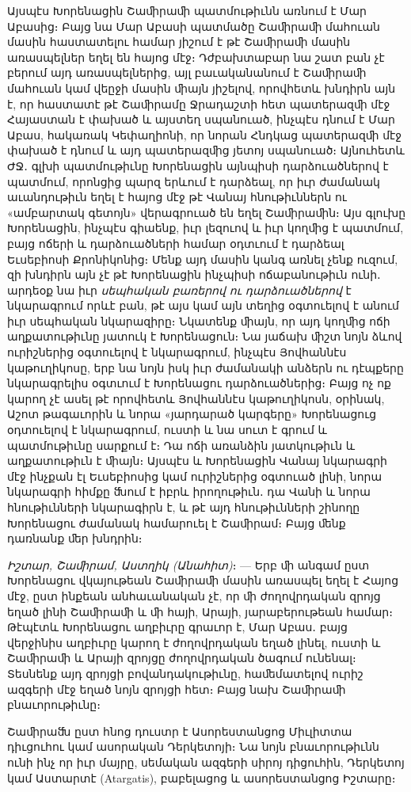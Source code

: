 \documentclass{article}
\begin{document}
{Այսպէս Խորենացին Շաﬕրաﬕ պատմութիւնն առնում է Մար Աբասից։ Բայց նա Մար Աբասի պատմածը Շաﬕրաﬕ մահուան մասին հաստատելու համար յիշում է թէ Շաﬕրաﬕ մասին առասպելներ եղել են հայոց մէջ։ Դժբախտաբար նա շատ բան չէ բերում այդ առասպելներից, այլ բաւականանում է Շաﬕրաﬕ մահուան կամ վեըջի մասին ﬕայն յիշելով, որովհետև խնդիրն այն է, որ հաստատէ թէ Շաﬕրամը Ջրադաշտի հետ պատերազﬕ մէջ Հայաստան է փախած և այստեղ սպանուած, ինչպէս դնում է Մար Աբաս, հակառակ Կեփաղիոնի, որ նորան Հնդկաց պատերազﬕ մէջ փախած է դնում և այդ պատերազﬕց յետոյ սպանուած։ Այնուհետև ԺՋ․ գլխի պատմութիւնը Խորենացին այնպիսի դարձուածներով է պատմում, որոնցից պարզ երևում է դարձեալ, որ իւր ժամանակ աւանդութիւն եղել է հայոց մէջ թէ Վանայ հնութիւններն ու «ամբարտակ գետոյն» վերագրուած են եղել Շաﬕրաﬕն։ Այս գլուխը Խորենացին, ինչպէս գիաենք, իւր լեզուով և իւր կողﬕց է պատմում, բայց ոճերի և դարձուածների համար օդտւում է դարձեալ Եւսեբիոսի Քրոնիկոնից։ Մենք այդ մասին կանգ առնել չենք ուզում, զի խնդիրն այն չէ թէ Խորենացին ինչպիսի ոճաբանութիւն ունի․ արդեօք նա իւր \emph{սեպհական բառերով ու դարձուածներով} է նկարագրում որևէ բան, թէ այս կամ այն տեղից օգտուելով է անում իւր սեպհական նկարազիրը։ Նկատենք ﬕայն, որ այդ կողﬕց ոճի աղքատութիւնը յատուկ է Խորենացուն։ Նա յաճախ ﬕշտ նոյն ձևով ուրիշներից օգտուելով է նկարագրում, ինչպէս Յովհաննէս կաթուղիկոսը, երբ նա նոյն իսկ իւր ժամանակի անձերն ու դէպքերը նկարագրելիս օգտւում է Խորենացու դարձուածներից։ Բայց ոչ ոք կարող չէ ասել թէ որովհետև Յովհաննէս կաթուղիկոսն, օրինակ, Աշոտ թագաւորին և նորա «յարդարած կարգերը» Խորենացուց օդտուելով է նկարագրում, ուստի և նա սուտ է գրում և պատմութիւնը սարքում է։ Դա ոճի առանձին յատկութիւն և աղքատութիւն է ﬕայն։ Այսպէս և Խորենացին Վանայ նկարագրի մէջ ինչքան էլ Եւսեբիոսից կամ ուրիշներից օգտուած լինի, նորա նկարագրի հիմքը ﬓում է իբրև իրողութիւն․ դա Վանի և նորա հնութիւնների նկարագիրն է, և թէ այդ հնութիւնների շինողը Խորենացու ժամանակ համարուել է Շաﬕրամ։ Բայց ﬔնք դառնանք ﬔր խնդրին։

\emph{Իշտար, Շաﬕրամ, Աստղիկ (Անահիտ)}։ — Երբ ﬕ անգամ ըստ Խորենացու վկայութեան Շաﬕրաﬕ մասին առասպել եղել է Հայոց մէջ, ըստ ինքեան անհաւանական չէ, որ ﬕ ժողովրդական զրոյց եղած լինի Շաﬕրաﬕ և ﬕ հայի, Արայի, յարաբերութեան համար։ Թէպէտև Խորենացու աղբիւրը գրաւոր է, Մար Աբաս․ բայց վերջինիս աղբիւրը կարող է ժողովրդական եղած լինել, ուստի և Շաﬕրաﬕ և Արայի զրոյցը ժողովրդական ծագում ունենալ։ Տեսնենք այդ զրոյցի բովանդակութիւնը, հաﬔմատելով ուրիշ ազգերի մէջ եղած նոյն զրոյցի հետ։ Բայց նախ Շաﬕրաﬕ բնաւորութիւնը։

Շաﬕրաﬓ ըստ հնոց դուստր է Ասորեստանցոց Միւլիտտա դիւցուհու կամ ասորական Դերկետոյի։ Նա նոյն բնաւորութիւնն ունի ինչ որ իւր մայրը, սեմական ազգերի սիրոյ դիցուհին, Դերկետոյ կամ Աստարտէ (Atargatis), բաբելացոց և ասորեստանցոց Իշտարը։

}
\end{document}
